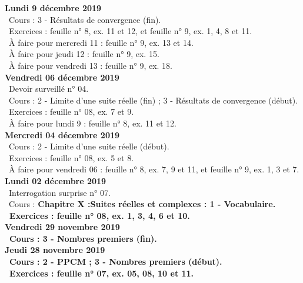 \documentclass[12pt,a4paper]{article}
\begin{document}
\noindent\textbf{Lundi 9 décembre 2019}\\
\bu\ Cours : 3 - Résultats de convergence (fin).\\
\bu\ Exercices : feuille n° 8, ex. 11 et 12, et feuille n° 9, ex. 1, 4, 8 et 11.\\ 
\bu\ À faire pour mercredi 11 : feuille n° 9, ex. 13 et 14.\\
\bu\ À faire pour jeudi 12 : feuille n° 9, ex. 15.\\
\bu\ À faire pour vendredi 13 : feuille n° 9, ex. 18.\vspace{.4cm}\\

\noindent\textbf{Vendredi 06 décembre 2019}\\
\bu\ Devoir surveillé n° 04.\\
\bu\ Cours : 2 - Limite d'une suite réelle (fin) ; 3 - Résultats de convergence (début).\\
\bu\ Exercices : feuille n° 08, ex. 7 et 9.\\
\bu\ À faire pour lundi 9 : feuille n° 8, ex. 11 et 12.\vspace{.4cm}\\
  
\noindent\textbf{Mercredi 04 décembre 2019}\\
\bu\ Cours : 2 - Limite d'une suite réelle (début).\\
\bu\ Exercices : feuille n° 08, ex. 5 et 8.\\
\bu\ À faire pour vendredi 06 : feuille n° 8, ex. 7, 9 et 11, et feuille n° 9, ex. 1, 3 et 7.\vspace{.4cm}\\

\noindent\textbf{Lundi 02 décembre 2019}\\
\bu\ Interrogation surprise n° 07.\\
\bu\ Cours : \bf Chapitre X :\rm Suites réelles et complexes : 1 - Vocabulaire.
\\
\bu\ Exercices : feuille n° 08, ex. 1, 3, 4, 6 et 10.\vspace{.4cm}\\

\noindent\textbf{Vendredi 29 novembre 2019}\\
\bu\ Cours : 3 - Nombres premiers (fin).\vspace{.4cm}\\


\noindent\textbf{Jeudi 28 novembre 2019}\\
\bu\ Cours : 2 - PPCM ; 3 - Nombres premiers (début).\\
\bu\ Exercices : feuille n° 07, ex. 05, 08, 10 et 11.\vspace{.4cm}\\
  
\end{document}
